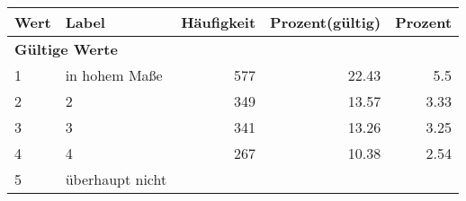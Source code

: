      \begin{longtable}{lXrrr}
     \toprule
     \textbf{Wert} & \textbf{Label} & \textbf{Häufigkeit} & \textbf{Prozent(gültig)} & \textbf{Prozent} \\
     \endhead
     \midrule
     \multicolumn{5}{l}{\textbf{Gültige Werte}}\\

     1 &
     \multicolumn{1}{X}{ in hohem Maße   } &


       \num{577} &
       \num[round-mode=places,round-precision=2]{22,43} &
         \num[round-mode=places,round-precision=2]{5,5} \\

     2 &
     \multicolumn{1}{X}{ 2   } &


       \num{349} &
       \num[round-mode=places,round-precision=2]{13,57} &
         \num[round-mode=places,round-precision=2]{3,33} \\

     3 &
     \multicolumn{1}{X}{ 3   } &


       \num{341} &
       \num[round-mode=places,round-precision=2]{13,26} &
         \num[round-mode=places,round-precision=2]{3,25} \\

     4 &
     \multicolumn{1}{X}{ 4   } &


       \num{267} &
       \num[round-mode=places,round-precision=2]{10,38} &
         \num[round-mode=places,round-precision=2]{2,54} \\

     5 &
     \multicolumn{1}{X}{ überhaupt nicht   } &



\end{longtable}
